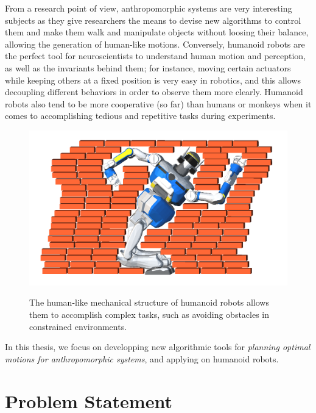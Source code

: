 From a research point of view, anthropomorphic systems are very
interesting subjects as they give researchers the means to devise new
algorithms to control them and make them walk and manipulate objects
without loosing their balance, allowing the generation of human-like
motions. Conversely, humanoid robots are the perfect tool for
neuroscientists to understand human motion and perception, as well as
the invariants behind them; for instance, moving certain actuators
while keeping others at a fixed position is very easy in robotics, and
this allows decoupling different behaviors in order to observe
them more clearly. Humanoid robots also tend to be more cooperative
(so far) than humans or monkeys when it comes to accomplishing tedious
and repetitive tasks during experiments.

\begin{figure}
  \centering
      {\includegraphics[width = 0.7\linewidth]
        {src/chap0-introduction/hrp2-brick-wall.png}}
      \caption{The human-like mechanical structure of humanoid robots
        allows them to accomplish complex tasks, such as avoiding
        obstacles in constrained environments.}
      \label{fig:chap0-hrp2-brick-wall}
\end{figure}

In this thesis, we focus on developping new algorithmic tools for
\emph{planning optimal motions for anthropomorphic systems}, and
applying on humanoid robots.

\section{Problem Statement}

